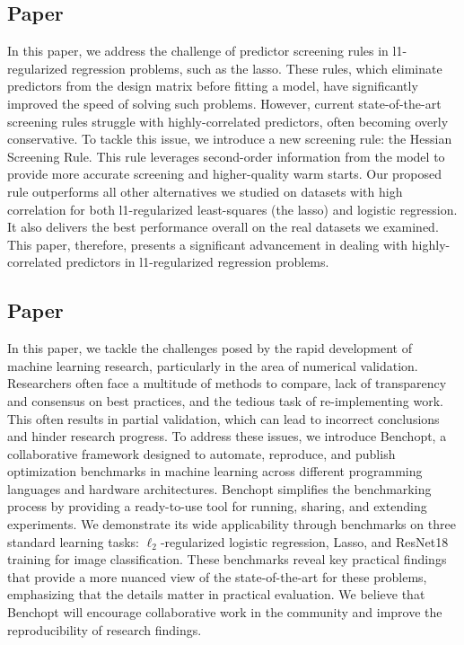 \subsection{Paper \III}

In this paper, we address the challenge of predictor screening rules in l1-regularized regression problems, such as the lasso. These rules, which eliminate predictors from the design matrix before fitting a model, have significantly improved the speed of solving such problems. However, current state-of-the-art screening rules struggle with highly-correlated predictors, often becoming overly conservative. To tackle this issue, we introduce a new screening rule: the Hessian Screening Rule. This rule leverages second-order information from the model to provide more accurate screening and higher-quality warm starts. Our proposed rule outperforms all other alternatives we studied on datasets with high correlation for both l1-regularized least-squares (the lasso) and logistic regression. It also delivers the best performance overall on the real datasets we examined. This paper, therefore, presents a significant advancement in dealing with highly-correlated predictors in l1-regularized regression problems.

\subsection{Paper \IV}

In this paper, we tackle the challenges posed by the rapid development of machine learning research, particularly in the area of numerical validation. Researchers often face a multitude of methods to compare, lack of transparency and consensus on best practices, and the tedious task of re-implementing work. This often results in partial validation, which can lead to incorrect conclusions and hinder research progress. To address these issues, we introduce Benchopt, a collaborative framework designed to automate, reproduce, and publish optimization benchmarks in machine learning across different programming languages and hardware architectures. Benchopt simplifies the benchmarking process by providing a ready-to-use tool for running, sharing, and extending experiments. We demonstrate its wide applicability through benchmarks on three standard learning tasks: $\ell_2$-regularized logistic regression, Lasso, and ResNet18 training for image classification. These benchmarks reveal key practical findings that provide a more nuanced view of the state-of-the-art for these problems, emphasizing that the details matter in practical evaluation. We believe that Benchopt will encourage collaborative work in the community and improve the reproducibility of research findings.

